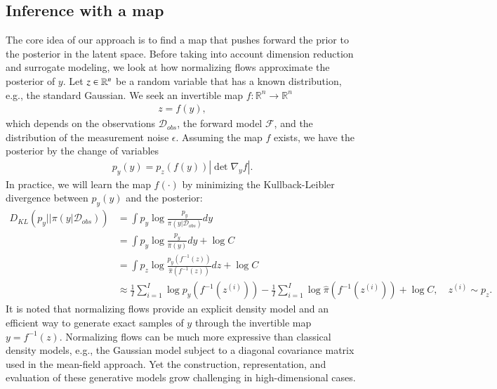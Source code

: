 \subsection{Inference with a map}
The core idea of our approach is to find a map that pushes forward the prior to the posterior in the latent space. Before taking into account dimension reduction and surrogate modeling, we look at how normalizing flows approximate the posterior of $y$. 
Let $z \in \mathbb{R}^n$ be a random variable that has a known distribution, e.g., the standard Gaussian. 
We seek an invertible map $f: \mathbb{R}^n\to\mathbb{R}^n$
\begin{align}
	z=f(y),
\end{align}
which depends on the observations $\mathcal{D}_{obs}$, the forward model $\mathcal{F}$, and the distribution of the measurement noise $\epsilon$. Assuming the map $f$ exists, we have the posterior by the change of variables 
\begin{align}
	p_y(y)=p_{z}(f(y)) \left |\det\nabla_{y} f \right|.
\end{align}
In practice, we will learn the map $f(\cdot)$ by minimizing the Kullback-Leibler divergence between $p_y(y)$ and the posterior:
\begin{align}
	D_{KL}\left(p_y||\pi\left(y|\mathcal{D}_{obs}\right)\right)&=\int p_{y}\log \frac{p_{y}}{\pi(y|\mathcal{D}_{obs})} dy \nonumber\\
	&=\int p_{y}\log \frac{p_{y}}{\hat{\pi}(y)} dy+\log C \nonumber\\
	&=\int p_{z}\log \frac{p_{y}(f^{-1}(z))}{\hat{\pi}(f^{-1}(z))} dz +\log C\nonumber\\
	&\approx\frac{1}{I}\sum_{i=1}^I\log p_{y}\left(f^{-1}\left(z^{(i)}\right)\right)-\frac{1}{I}\sum_{i=1}^I\log \hat{\pi}\left(f^{-1}\left(z^{(i)}\right)\right)+\log C,\quad z^{(i)} \sim p_{z}.\label{highkl}
\end{align}
It is noted that normalizing flows provide an explicit density model and an efficient way to generate exact samples of $y$ through the invertible map $y=f^{-1}(z)$. Normalizing flows can be much more expressive than classical density models, e.g., the Gaussian model subject to a diagonal covariance matrix used in the mean-field approach. Yet the construction, representation, and evaluation of these generative models grow challenging in high-dimensional cases.
